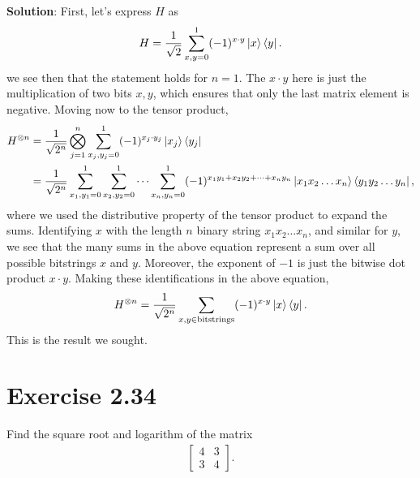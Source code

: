 \documentclass{book}
\begin{document}
    \textbf{Solution}: First, let's express $H$ as
    \begin{align}
        H = \frac{1}{\sqrt{2}}\sum_{x,y = 0}^1 (-1)^{x\cdot y} \ket{x}\bra{y}.
    \end{align}
    we see then that the statement holds for $n = 1$. The $x\cdot y$ here is just the multiplication of two bits $x, y$, which ensures that only the last matrix element is negative. Moving now to the tensor product,
    \begin{align}
        H^{\otimes n} &= \frac{1}{\sqrt{2^n}} \bigotimes_{j = 1}^n \sum_{x_j, y_j = 0}^1 (-1)^{x_j\cdot y_j} \ket{x_j}\bra{y_j} \\
        &= \frac{1}{\sqrt{2^n}} \sum_{x_1, y_1 = 0}^1 \sum_{x_2, y_2 = 0}^1 \dots \sum_{x_n, y_n = 0}^1 (-1)^{x_1 y_1 + x_2 y_2 + \dots + x_n y_n} \ket{x_1 x_2 \dots x_n} \bra{y_1 y_2 \dots y_n},
    \end{align}
    where we used the distributive property of the tensor product to expand the sums. Identifying $x$ with the length $n$ binary string $x_1 x_2 \dots x_n$, and similar for $y$, we see that the many sums in the above equation represent a sum over all possible bitstrings $x$ and $y$. Moreover, the exponent of $-1$ is just the bitwise dot product $x\cdot y$. Making these identifications in the above equation,
    \begin{align}
        H^{\otimes n} = \frac{1}{\sqrt{2^n}} \sum_{x,y \in \text{bitstrings}} (-1)^{x\cdot y} \ket{x}\bra{y}.
    \end{align}
    This is the result we sought. 
    
\section*{Exercise 2.34}
    Find the square root and logarithm of the matrix
    \begin{align}
    \begin{bmatrix}
        4 & 3 \\
        3 & 4
    \end{bmatrix}.
    \end{align}
    
\end{document}
